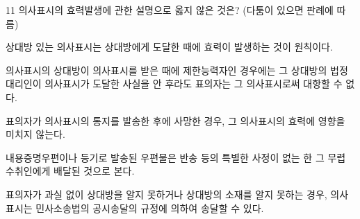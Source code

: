 \begin{question}{11}
의사표시의 효력발생에 관한 설명으로 옳지 않은 것은? (다툼이 있으면 판례에 따름)
\begin{choices}
  \item 상대방 있는 의사표시는 상대방에게 도달한 때에 효력이 발생하는 것이 원칙이다.
  \item 의사표시의 상대방이 의사표시를 받은 때에 제한능력자인 경우에는 그 상대방의 법정대리인이 의사표시가 도달한 사실을 안 후라도 표의자는 그 의사표시로써 대항할 수 없다.
  \item 표의자가 의사표시의 통지를 발송한 후에 사망한 경우, 그 의사표시의 효력에 영향을 미치지 않는다.
  \item 내용증명우편이나 등기로 발송된 우편물은 반송 등의 특별한 사정이 없는 한 그 무렵 수취인에게 배달된 것으로 본다.
  \item 표의자가 과실 없이 상대방을 알지 못하거나 상대방의 소재를 알지 못하는 경우, 의사표시는 민사소송법의 공시송달의 규정에 의하여 송달할 수 있다.
\end{choices}
\end{question}
